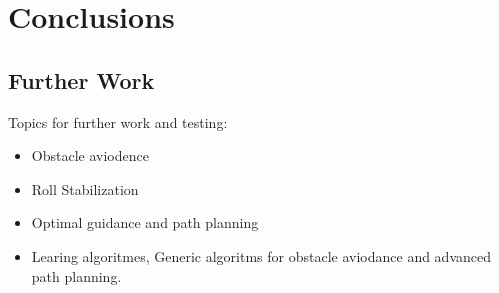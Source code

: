 \chapter{Conclusions}






\section{Further Work}
	Topics for further work and testing:
	\begin{itemize}
		\item Obstacle aviodence
		\item Roll Stabilization
		\item Optimal guidance and path planning
		\item Learing algoritmes, Generic algoritms for obstacle  aviodance and advanced path
		planning.
	\end{itemize}


